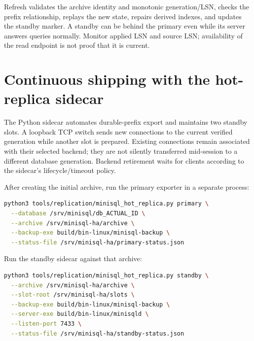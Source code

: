 
Refresh validates the archive identity and monotonic generation/LSN, checks
the prefix relationship, replays the new state, repairs derived indexes, and
updates the standby marker. A standby can be behind the primary even while
its server answers queries normally. Monitor applied LSN and source LSN;
availability of the read endpoint is not proof that it is current.


\section{Continuous shipping with the hot-replica sidecar}

The Python sidecar automates durable-prefix export and maintains two standby
slots. A loopback TCP switch sends new connections to the current verified
generation while another slot is prepared. Existing connections remain
associated with their selected backend; they are not silently transferred
mid-session to a different database generation. Backend retirement waits for
clients according to the sidecar's lifecycle/timeout policy.

After creating the initial archive, run the primary exporter in a separate
process:

\begin{lstlisting}[language=bash]
python3 tools/replication/minisql_hot_replica.py primary \
  --database /srv/minisql/db_ACTUAL_ID \
  --archive /srv/minisql-ha/archive \
  --backup-exe build/bin-linux/minisql-backup \
  --status-file /srv/minisql-ha/primary-status.json
\end{lstlisting}

Run the standby sidecar against that archive:

\begin{lstlisting}[language=bash]
python3 tools/replication/minisql_hot_replica.py standby \
  --archive /srv/minisql-ha/archive \
  --slot-root /srv/minisql-ha/slots \
  --backup-exe build/bin-linux/minisql-backup \
  --server-exe build/bin-linux/minisqld \
  --listen-port 7433 \
  --status-file /srv/minisql-ha/standby-status.json
\end{lstlisting}

